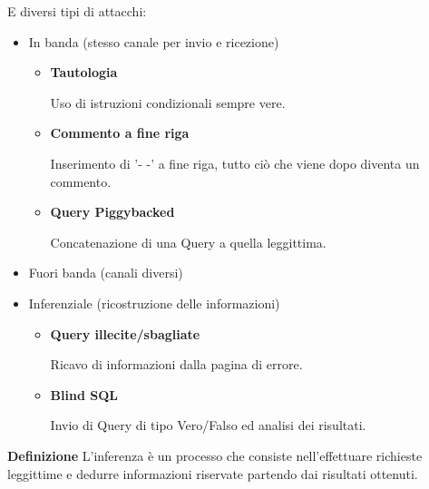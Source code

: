 \documentclass{article}
\newcommand{\df}[1]{\noindent\textbf{Definizione } #1.\newline}
\begin{document}
\noindent E diversi tipi di attacchi:
\begin{itemize}
    \item In banda (stesso canale per invio e ricezione)
        \begin{itemize}
            \item \textbf{Tautologia}

                Uso di istruzioni condizionali sempre vere.
            
            \item \textbf{Commento a fine riga}

                Inserimento di '- -' a fine riga, tutto ciò che viene dopo diventa un commento.
            
            \item \textbf{Query Piggybacked}

                Concatenazione di una Query a quella leggittima.
            
        \end{itemize}

    \item Fuori banda (canali diversi)

    \item Inferenziale (ricostruzione delle informazioni)
        \begin{itemize}
            \item \textbf{Query illecite/sbagliate}

                Ricavo di informazioni dalla pagina di errore.
            
            \item \textbf{Blind SQL}

                Invio di Query di tipo Vero/Falso ed analisi dei risultati.\newline
            
        \end{itemize}
\end{itemize}

\df{L'inferenza è un processo che consiste nell'effettuare richieste leggittime e dedurre informazioni riservate partendo dai risultati ottenuti}

\newpage
\end{document}
